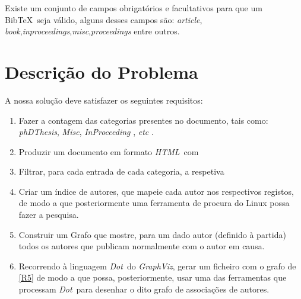 \documentclass[11pt,a4paper]{report}
\begin{document}
Existe um conjunto de campos obrigatórios e facultativos para que um Bib\TeX \ seja válido, alguns desses campos são: \emph{article}, \emph{book},\emph{inproceedings},\emph{misc},\emph{proceedings} entre outros.



\newpage

\section{Descrição do Problema}
\newcommand{\gv}{\emph{GraphViz}}
\newcommand{\htlm}{\emph{HTML}}
\newcommand{\dott}{\emph{Dot}}
\newcommand{\bib}{Bib\TeX}



A nossa solução deve satisfazer os seguintes requisitos: 
\begin{enumerate}[label=R\arabic*]
\item\label{R1} Fazer a contagem das categorias presentes no documento, tais como: \emph{phDThesis}, \emph{Misc}, \emph{InProceeding }, \emph{etc }.
\item\label{R2}Produzir um documento em formato \htlm \ com
\item\label{R3} Filtrar, para cada entrada de cada categoria, a respetiva
\item\label{R4} Criar um índice de autores, que mapeie cada autor nos respectivos registos, de modo a que posteriormente uma ferramenta de procura do Linux possa fazer a pesquisa.
\item\label{R5} Construir um Grafo que mostre, para um dado autor (definido à partida) todos os autores que publicam normalmente com o autor em causa.
\item\label{R6}Recorrendo à linguagem \dott \  do \gv, gerar um ficheiro com o grafo de \ref{R5} de modo a que possa, posteriormente, usar uma das ferramentas que processam \dott \  para desenhar o dito grafo de associações de autores.
\end{enumerate}
\end{document}
